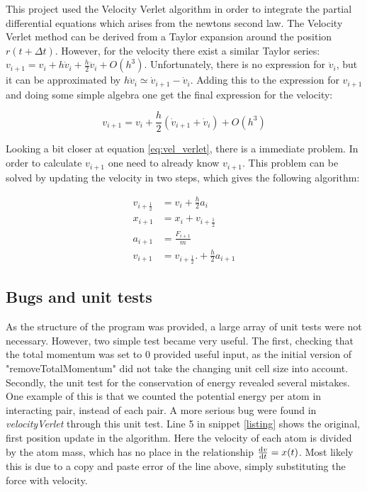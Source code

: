 This project used the Velocity Verlet algorithm in order to integrate the partial differential equations which arises from the newtons second law. 	The Velocity Verlet method can be derived from a Taylor expansion around the position $ r(t+\Delta t) $. However, for the velocity there exist a similar Taylor series: $  v_{i+1} = v_i + h\dot{v}_i + \frac{h}{2} \ddot{v}_i + O(h^3)$. Unfortunately, there is no expression for $ \ddot{v}_i $, but it can be approximated by $ h\ddot{v}_i \simeq \dot{v}_{i+1}-\dot{v}_i$. Adding this to the expression for $ v_{i+1} $ and doing some simple algebra one get the final expression for the velocity:

\begin{equation}
v_{i+1} = v_i +  \frac{h}{2} \left(\dot{v}_{i+1}+\dot{v}_i\right)+ O(h^3) \label{eq:vel_verlet}
\end{equation}

Looking a bit closer at equation \ref{eq:vel_verlet}, there is a immediate problem. In order to calculate $ v_{i+1} $ one need to already know $ v_{i+1} $. This problem can be solved by updating the velocity in two steps, which gives the following algorithm:

\begin{align}
v_{i+\frac{1}{2}} &= v_i + \frac{h}{2} a_i\\
x_{i+1} &= x_i + v_{i+\frac{1}{2}}\\
a_{i+1} &= \frac{F_{i+1}}{m}\\
v_{i+1} &=v_{i+\frac{1}{2}}. + \frac{h}{2} a_{i+1}
\end{align} 


\subsection{Bugs and unit tests}

As the structure  of the program was provided, a large array of unit tests were not necessary. However, two simple test became very useful. The first, checking that the total momentum was set to 0 provided useful input, as the initial version of "removeTotalMomentum" did not take the changing unit cell size into account. Secondly, the unit test for the conservation of energy revealed several mistakes. One example of this is that we counted the potential energy per atom in interacting pair, instead of each pair. A more serious bug were found in \textit{velocityVerlet} through this unit test. Line 5 in snippet \ref{listing} shows the original, first position update in the algorithm. Here the velocity of each atom is divided by the atom mass, which has no place in the relationship $ \dv{v}{t} = x(t) $. Most likely this is due to a copy and paste error of the line above, simply substituting the force with velocity. 

